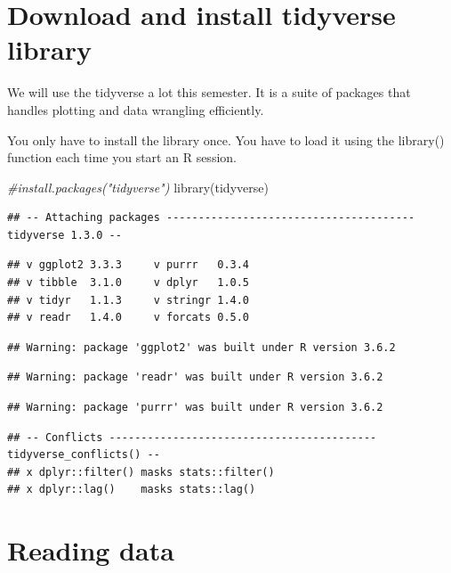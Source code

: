 \documentclass[
]{book}
\newenvironment{Shaded}{\begin{snugshade}}{\end{snugshade}}
\newcommand{\CommentTok}[1]{\textcolor[rgb]{0.56,0.35,0.01}{\textit{#1}}}
\newcommand{\FunctionTok}[1]{\textcolor[rgb]{0.00,0.00,0.00}{#1}}
\newcommand{\NormalTok}[1]{#1}
\begin{document}
\hypertarget{download-and-install-tidyverse-library}{%
\section{Download and install tidyverse library}\label{download-and-install-tidyverse-library}}

We will use the tidyverse a lot this semester. It is a suite of packages that handles plotting and data wrangling efficiently.

You only have to install the library once. You have to load it using the library() function each time you start an R session.

\begin{Shaded}
\begin{Highlighting}[]
\CommentTok{\#install.packages("tidyverse")}
\FunctionTok{library}\NormalTok{(tidyverse)}
\end{Highlighting}
\end{Shaded}

\begin{verbatim}
## -- Attaching packages --------------------------------------- tidyverse 1.3.0 --
\end{verbatim}

\begin{verbatim}
## v ggplot2 3.3.3     v purrr   0.3.4
## v tibble  3.1.0     v dplyr   1.0.5
## v tidyr   1.1.3     v stringr 1.4.0
## v readr   1.4.0     v forcats 0.5.0
\end{verbatim}

\begin{verbatim}
## Warning: package 'ggplot2' was built under R version 3.6.2
\end{verbatim}

\begin{verbatim}
## Warning: package 'readr' was built under R version 3.6.2
\end{verbatim}

\begin{verbatim}
## Warning: package 'purrr' was built under R version 3.6.2
\end{verbatim}

\begin{verbatim}
## -- Conflicts ------------------------------------------ tidyverse_conflicts() --
## x dplyr::filter() masks stats::filter()
## x dplyr::lag()    masks stats::lag()
\end{verbatim}

\hypertarget{reading-data}{%
\section{Reading data}\label{reading-data}}
\end{document}
